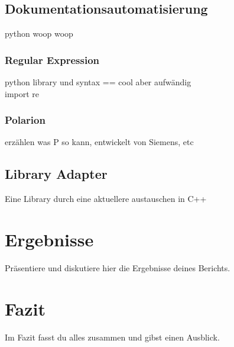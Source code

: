 \documentclass[a4paper, 12pt]{article}
\begin{document}
\subsection{Dokumentationsautomatisierung}\label{Dokumentationsautomatisierung}
python woop woop
\subsubsection{Regular Expression}\label{regularExpression}
python library und syntax == cool aber aufwändig \\
import re
\subsubsection{Polarion}\label{polarion}
erzählen was P so kann, entwickelt von Siemens, etc

\subsection{Library Adapter}\label{LibraryAdapter}
Eine Library durch eine aktuellere austauschen in C++

\newpage
\section{Ergebnisse}
Präsentiere und diskutiere hier die Ergebnisse deines Berichts.

\newpage
\section{Fazit}
Im Fazit fasst du alles zusammen und gibst einen Ausblick.

\newpage

\end{document}
